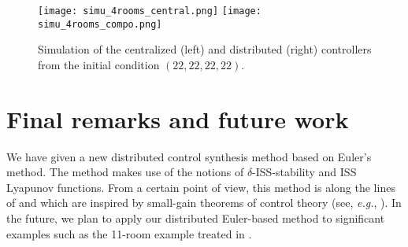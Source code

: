 \begin{figure}[ht]
 \centering
 \texttt{[image: simu\_4rooms\_central.png]}%
%
 \texttt{[image: simu\_4rooms\_compo.png]}
 \caption{Simulation of the centralized (left) and distributed (right) controllers
 from the initial condition $(22,22,22,22)$.}
  \label{fig:simu_4rooms}
\end{figure}

 \section{Final remarks and future work}\label{sec:conc_part4}

 We have given a new distributed control synthesis method based on
 Euler's method.  The method makes use of the notions of
 $\delta$-ISS-stability and ISS Lyapunov functions.  From a certain
 point of view, this method is along the lines of
 \cite{dallal2015compositional} and \cite{kim2015compositional} which
 are inspired by small-gain theorems of control theory (see,
 \textit{e.g.}, \cite{jiang1994small}). In the future, we plan to
 apply our distributed Euler-based method to significant examples such
 as the 11-room example treated in
 \cite{larsen2015online,le2016distributed}.






